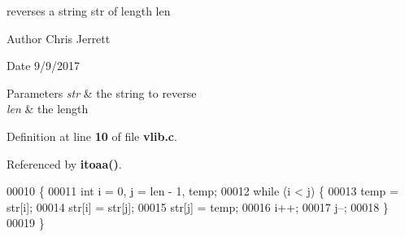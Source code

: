 reverses a string \textquotesingle{}str\textquotesingle{} of length \textquotesingle{}len\textquotesingle{} 

\begin{DoxyAuthor}{Author}
Chris Jerrett 
\end{DoxyAuthor}
\begin{DoxyDate}{Date}
9/9/2017 
\end{DoxyDate}

\begin{DoxyParams}{Parameters}
{\em str} & the string to reverse \\
\hline
{\em len} & the length \\
\hline
\end{DoxyParams}


Definition at line \textbf{ 10} of file \textbf{ vlib.\+c}.



Referenced by \textbf{ itoaa()}.


\begin{DoxyCode}
00010                                  \{
00011   \textcolor{keywordtype}{int} i = 0, j = len - 1, temp;
00012   \textcolor{keywordflow}{while} (i < j) \{
00013     temp = str[i];
00014     str[i] = str[j];
00015     str[j] = temp;
00016     i++;
00017     j--;
00018   \}
00019 \}
\end{DoxyCode}
